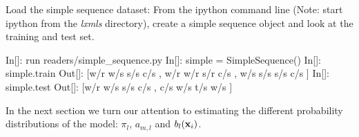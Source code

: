 \begin{exercise}
Load the simple sequence dataset:
From the ipython command line (Note: start ipython from the \emph{lxmls}
directory), create a simple sequence object and look at the training
and test set.
\begin{python}
 In[]: run readers/simple_sequence.py
 In[]: simple = SimpleSequence()
 In[]: simple.train
Out[]: [w/r w/s s/s c/s , w/r w/r s/r c/s , w/s s/s s/s c/s ]
 In[]: simple.test
Out[]: [w/r w/s s/s c/s , c/s w/s t/s w/s ] 
\end{python}
\end{exercise}




In the next section we turn our attention to estimating the different
probability distributions of the model: $\pi_l$, $a_{m,l}$ and $b_l(\mathbf{x}_i)$.
